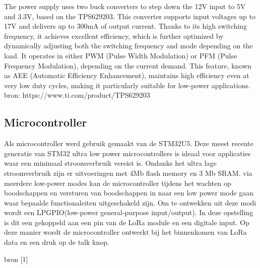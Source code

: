 The power supply uses two buck converters to step down the 12V input to 5V and 3.3V, based on the TPS629203.
 This converter supports input voltages up to 17V and delivers up to 300mA of output current.
 Thanks to its high switching frequency, it achieves excellent efficiency, which is further optimized by dynamically adjusting both the switching frequency and mode depending on the load. It operates in either PWM (Pulse Width Modulation) or PFM (Pulse Frequency Modulation), depending on the current demand. This feature, known as AEE (Automatic Efficiency Enhancement), maintains high efficiency even at very low duty cycles, making it particularly suitable for low-power applications.\\


bron:	https://www.ti.com/product/TPS629203

\subsection{Microcontroller}

Als microcontroller werd gebruik gemaakt van de STM32U5.
 Deze meest recente generatie van STM32 ultra low power microcontrollers
 is ideaal voor applicaties waar een minimaal stroomverbruik vereist is.
Ondanks het ultra lage stroomverbruik zijn er uitvoeringen met 4Mb flash memory en 3 Mb SRAM.
via meerdere low-power modes kan de microcontroller tijdens het wachten op boodschappen
 en versturen van boodschappen in naar een low power mode gaan waar bepaalde functionaleiten uitgeschakeld zijn.
Om te ontwekken uit deze modi wordt een LPGPIO(low-power general-purpose input/output). 
In deze opstelling is dit een gekoppeld aan een pin van de LoRa module en een digitale input.
Op deze manier wordt de microcontroller ontwerkt bij het binnenkomen van LoRa data en een druk op de talk knop.





bron [1]




